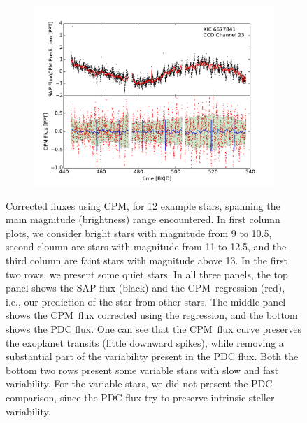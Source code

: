 \documentclass[12pt, preprint]{aastex}
\newcommand{\name}{CPM}
\begin{document}
\begin{figure}[htb]
\begin{subfigure}[htb]{0.33\textwidth}
\end{subfigure}%
\hfill
\begin{subfigure}[htb]{0.33\textwidth}
\includegraphics[width=\textwidth]{kic_6677841}
\end{subfigure}

\caption{\label{fluxes} Corrected fluxes using \name, for 12 example stars, spanning the main magnitude (brightness) range encountered. 
In first column plots,   we consider bright stars with magnitude from 9 to 10.5, second cloumn are stars with magnitude from 11 to 12.5,  
and the third column are faint stars with magnitude above 13. In the first two rows, we present some quiet stars. 
In all three panels, the top panel shows the SAP flux (black) and the \name\ regression (red), i.e., our prediction of the star from other stars. 
The middle panel shows the \name\ flux corrected using the regression, and the bottom shows the PDC flux. 
One can see that the \name\ flux curve preserves the exoplanet transits (little downward spikes), 
while removing a substantial part of the variability present in the PDC flux. 
Both the bottom two rows present some variable stars with slow and fast variability. 
For the variable stars, we did not present the PDC comparison, since the PDC flux try to preserve intrinsic steller variability.}
\end{figure}
\end{document}
